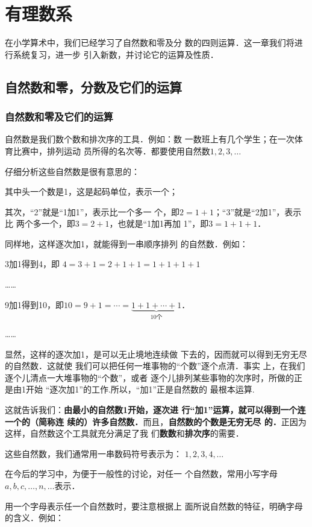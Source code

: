 \chapter{有理数系}

在小学算术中，我们已经学习了自然数和零及分
数的四则运算．这一章我们将进行系统复习，进一步
引入新数，并讨论它的运算及性质．

\section{自然数和零，分数及它们的运算}

\subsection{自然数和零及它们的运算}

自然数是我们数个数和排次序的工具．例如：数
一数班上有几个学生；在一次体育比赛中，排列运动
员所得的名次等．都要使用自然数$1,  2,  3,\ldots$

仔细分析这些自然数是很有意思的：

其中头一个数是1，这是起码单位，表示一个；

其次，“2”就是“1加1”，表示比一个多一
个，即$2=1+1$；“3”就是“2加1”，表示比
两个多一个，即$3=2+1$，也就是“1加1再加
1”，即$3=1+1+1$．

同样地，这样逐次加1，就能得到一串顺序排列
的自然数．例如：  

3加1得到4，即
$4=3+1=2+1+1=1+1+1+1$

……

9加1得到10，即$10= 9+1=\cdots=\underbrace{1+1+\cdots+1}_{10\text{个}}$．

……

显然，这样的逐次加1，是可以无止境地连续做
下去的，因而就可以得到无穷无尽的自然数．这就使
我们可以把任何一堆事物的“个数”逐个点清．事实
上，在我们逐个儿清点一大堆事物的“个数”，或者
逐个儿排列某些事物的次序时，所做的正是由1开始
“逐次加1”的工作.所以，“加1”正是自然数的
最根本运算.

这就告诉我们：\textbf{由最小的自然数1开始，逐次进
	行“加1”运算，就可以得到一个连一个的（简称连
	续的）许多自然数．}而且，\textbf{自然数的个数是无穷无尽
	的．}正因为这样，自然数这个工具就充分满足了我
们\textbf{数数}和\textbf{排次序}的需要．

这些自然数，我们通常用一串数码符号表示为：
$1,2,3,4,\ldots$

在今后的学习中，为便于一般性的讨论，对任一
个自然数，常用小写字母$a,b,c,\ldots,n,\ldots$表示．

用一个字母表示任一个自然数时，要注意根据上
面所说自然数的特征，明确字母的含义．例如：

